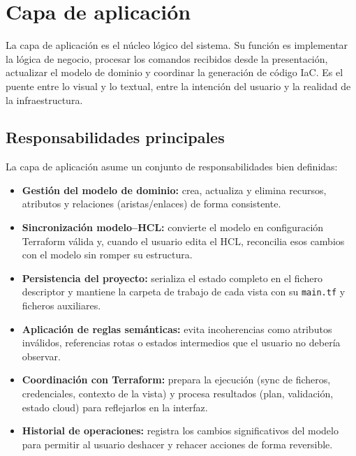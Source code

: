 \documentclass{article}
\begin{document}
    \section{Capa de aplicación}
    {
        \setlength{\parskip}{1em}

        \justify
        La capa de aplicación es el núcleo lógico del sistema. Su función es
        implementar la lógica de negocio, procesar los comandos recibidos desde la
        presentación, actualizar el modelo de dominio y coordinar la generación de
        código IaC. Es el puente entre lo visual y lo textual, entre la intención del
        usuario y la realidad de la infraestructura.

        \subsection{Responsabilidades principales}
        \justify
        La capa de aplicación asume un conjunto de responsabilidades bien definidas:
        
        \begin{itemize}
            \item \textbf{Gestión del modelo de dominio:} crea, actualiza y elimina
             recursos, atributos y relaciones (aristas/enlaces) de forma consistente.
            \item \textbf{Sincronización modelo--HCL:} convierte el modelo en
            configuración Terraform válida y, cuando el usuario edita el HCL, reconcilia
            esos cambios con el modelo sin romper su estructura.
            \item \textbf{Persistencia del proyecto:} serializa el estado completo en el
            fichero descriptor y mantiene la carpeta de trabajo de cada vista con su
            \texttt{main.tf} y ficheros auxiliares.
            \item \textbf{Aplicación de reglas semánticas:} evita incoherencias como
            atributos inválidos, referencias rotas o estados intermedios que el usuario
            no debería observar.
            \item \textbf{Coordinación con Terraform:} prepara la ejecución (sync de
            ficheros, credenciales, contexto de la vista) y procesa resultados (plan,
            validación, estado cloud) para reflejarlos en la interfaz.
            \item \textbf{Historial de operaciones:} registra los cambios
            significativos del modelo para permitir al usuario deshacer y
            rehacer acciones de forma reversible.
        \end{itemize}

}
\end{document}

